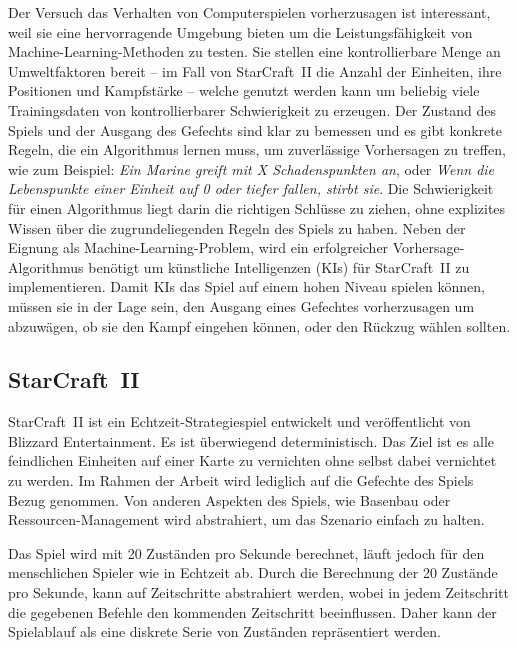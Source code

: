Der Versuch das Verhalten von Computerspielen vorherzusagen ist interessant, weil sie eine hervorragende Umgebung bieten um die Leistungsfähigkeit von Machine-Learning-Methoden zu testen. Sie stellen eine kontrollierbare Menge an Umweltfaktoren bereit -- im Fall von StarCraft~II die Anzahl der Einheiten, ihre Positionen und Kampfstärke -- welche genutzt werden kann um beliebig viele Trainingsdaten von kontrollierbarer Schwierigkeit zu erzeugen. Der Zustand des Spiels und der Ausgang des Gefechts sind klar zu bemessen und es gibt konkrete Regeln, die ein Algorithmus lernen muss, um zuverlässige Vorhersagen zu treffen, wie zum Beispiel: \textit{Ein Marine greift mit X Schadenspunkten an}, oder \textit{Wenn die Lebenspunkte einer Einheit auf 0 oder tiefer fallen, stirbt sie}. Die Schwierigkeit für einen Algorithmus liegt darin die richtigen Schlüsse zu ziehen, ohne explizites Wissen über die zugrundeliegenden Regeln des Spiels zu haben. Neben der Eignung als Machine-Learning-Problem, wird ein erfolgreicher Vorhersage-Algorithmus benötigt um künstliche Intelligenzen (KIs) für StarCraft~II zu implementieren. Damit KIs das Spiel auf einem hohen Niveau spielen können, müssen sie in der Lage sein, den Ausgang eines Gefechtes vorherzusagen um abzuwägen, ob sie den Kampf eingehen können, oder den Rückzug wählen sollten. 

\subsection{StarCraft~II}
\label{SC2}

StarCraft~II ist ein Echtzeit-Strategiespiel entwickelt und veröffentlicht von Blizzard Entertainment. Es ist überwiegend deterministisch\footnotemark. Das Ziel ist es alle feindlichen Einheiten auf einer Karte zu vernichten ohne selbst dabei vernichtet zu werden. Im Rahmen der Arbeit wird lediglich auf die Gefechte des Spiels Bezug genommen. Von anderen Aspekten des Spiels, wie Basenbau oder Ressourcen-Management wird abstrahiert, um das Szenario einfach zu halten.

Das Spiel wird mit 20 Zuständen pro Sekunde berechnet, läuft jedoch für den menschlichen Spieler wie in Echtzeit ab. Durch die Berechnung der 20 Zustände pro Sekunde, kann auf Zeitschritte abstrahiert werden, wobei in jedem Zeitschritt die gegebenen Befehle den kommenden Zeitschritt beeinflussen. Daher kann der Spielablauf als eine diskrete Serie von Zuständen repräsentiert werden.


